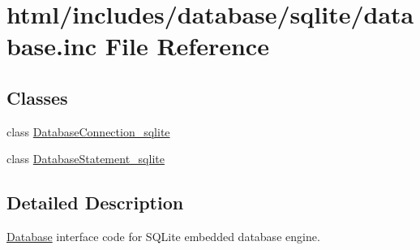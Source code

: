 \hypertarget{sqlite_2database_8inc}{
\section{html/includes/database/sqlite/database.inc File Reference}
\label{sqlite_2database_8inc}
}
\subsection*{Classes}
\begin{DoxyCompactItemize}
\item 
class \hyperlink{classDatabaseConnection__sqlite}{DatabaseConnection\_\-sqlite}
\item 
class \hyperlink{classDatabaseStatement__sqlite}{DatabaseStatement\_\-sqlite}
\end{DoxyCompactItemize}


\subsection{Detailed Description}
\hyperlink{classDatabase}{Database} interface code for SQLite embedded database engine. 
